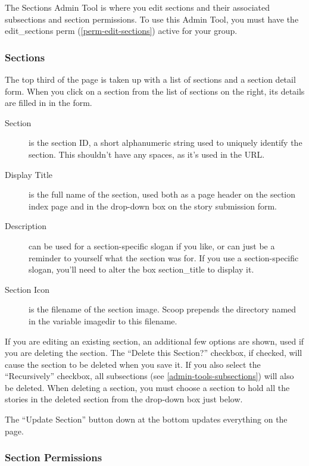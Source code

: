 The Sections Admin Tool is where you edit sections and their associated subsections and section permissions.  To use this Admin Tool, you must have the edit\_sections perm (\ref{perm-edit-sections}) active for your group.

\subsubsection{Sections}

The top third of the page is taken up with a list of sections and a section detail form.  When you click on a section from the list of sections on the right, its details are filled in in the form.

\begin{description}
\item[Section] is the section ID, a short alphanumeric string used to uniquely identify the section.  This shouldn't have any spaces, as it's used in the URL.
\item[Display Title] is the full name of the section, used both as a page header on the section index page and in the drop-down box on the story submission form.
\item[Description] can be used for a section-specific slogan if you like, or can just be a reminder to yourself what the section was for.  If you use a section-specific slogan, you'll need to alter the box section\_title to display it.
\item[Section Icon] is the filename of the section image.  Scoop prepends the directory named in the variable imagedir to this filename.
\end{description}

If you are editing an existing section, an additional few options are shown, used if you are deleting the section.  The ``Delete this Section?'' checkbox, if checked, will cause the section to be deleted when you save it.  If you also select the ``Recursively'' checkbox, all subsections (see \ref{admin-tools-subsections}) will also be deleted.  When deleting a section, you must choose a section to hold all the stories in the deleted section from the drop-down box just below.

The ``Update Section'' button down at the bottom updates everything on the page.

\subsubsection{Section Permissions}
\label{admin-tools-section-permissions}

